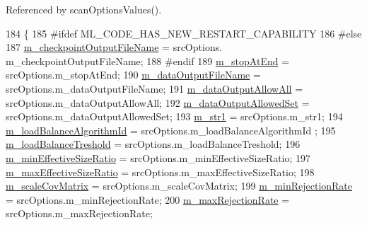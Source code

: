 Referenced by scan\-Options\-Values().


\begin{DoxyCode}
184 \{
185 \textcolor{preprocessor}{#ifdef ML\_CODE\_HAS\_NEW\_RESTART\_CAPABILITY}
186 \textcolor{preprocessor}{}\textcolor{preprocessor}{#else}
187 \textcolor{preprocessor}{}  \hyperlink{class_q_u_e_s_o_1_1_m_l_sampling_level_options_aa53156a239401da4600af25921bac260}{m\_checkpointOutputFileName}                  = srcOptions.
      m\_checkpointOutputFileName;
188 \textcolor{preprocessor}{#endif}
189 \textcolor{preprocessor}{}  \hyperlink{class_q_u_e_s_o_1_1_m_l_sampling_level_options_adbdb0fa054244261b7beb2cead72ef06}{m\_stopAtEnd}                                 = srcOptions.m\_stopAtEnd;
190   \hyperlink{class_q_u_e_s_o_1_1_m_l_sampling_level_options_a56871c5760820c93526948a6e1c024e5}{m\_dataOutputFileName}                        = srcOptions.m\_dataOutputFileName;
191   \hyperlink{class_q_u_e_s_o_1_1_m_l_sampling_level_options_ad6a290719785a151c5876bb04145442a}{m\_dataOutputAllowAll}                        = srcOptions.m\_dataOutputAllowAll;
192   \hyperlink{class_q_u_e_s_o_1_1_m_l_sampling_level_options_aeead47ca5a3ccd405bae013a344d1dce}{m\_dataOutputAllowedSet}                      = srcOptions.m\_dataOutputAllowedSet;
193   \hyperlink{class_q_u_e_s_o_1_1_m_l_sampling_level_options_ac3586b30eb3e0f67e44074073bb157ff}{m\_str1}                                      = srcOptions.m\_str1;
194   \hyperlink{class_q_u_e_s_o_1_1_m_l_sampling_level_options_af8f5d4ef3048da3e201e43ecc0a399fb}{m\_loadBalanceAlgorithmId}                    = srcOptions.m\_loadBalanceAlgorithmId
      ;
195   \hyperlink{class_q_u_e_s_o_1_1_m_l_sampling_level_options_a1cef7bbef6c1017714281e8e464367d6}{m\_loadBalanceTreshold}                       = srcOptions.m\_loadBalanceTreshold;
196   \hyperlink{class_q_u_e_s_o_1_1_m_l_sampling_level_options_a58904c5920d9fa6673a8222529d5c143}{m\_minEffectiveSizeRatio}                     = srcOptions.m\_minEffectiveSizeRatio;
197   \hyperlink{class_q_u_e_s_o_1_1_m_l_sampling_level_options_a6740534c2a37694cbc3775dbf60619a1}{m\_maxEffectiveSizeRatio}                     = srcOptions.m\_maxEffectiveSizeRatio;
198   \hyperlink{class_q_u_e_s_o_1_1_m_l_sampling_level_options_ac7deaeedd0deebf8ee14414fa3dbd334}{m\_scaleCovMatrix}                            = srcOptions.m\_scaleCovMatrix;
199   \hyperlink{class_q_u_e_s_o_1_1_m_l_sampling_level_options_a6010e1a97f0712b376653819aa6cdbca}{m\_minRejectionRate}                          = srcOptions.m\_minRejectionRate;
200   \hyperlink{class_q_u_e_s_o_1_1_m_l_sampling_level_options_ad7ec8ef589c49609d0082d3eb514bb13}{m\_maxRejectionRate}                          = srcOptions.m\_maxRejectionRate;

\end{DoxyCode}
